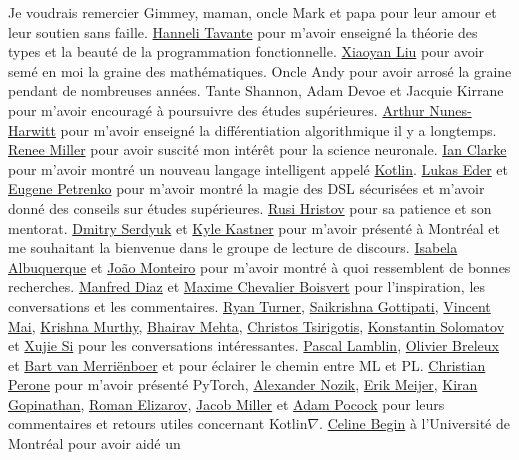 \vspace{-60pt} Je voudrais remercier Gimmey, maman, oncle Mark et papa pour leur amour et leur soutien sans faille. \href{http://hannelita.com/}{Hanneli Tavante} pour m'avoir enseigné la théorie des types et la beauté de la programmation fonctionnelle. \href{https://laverne.edu/directory/person/xiaoyan-liu/}{Xiaoyan Liu} pour avoir semé en moi la graine des mathématiques. Oncle Andy pour avoir arrosé la graine pendant de nombreuses années. Tante Shannon, Adam Devoe et Jacquie Kirrane pour m'avoir encouragé à poursuivre des études supérieures. \href{https://www.cs.rit.edu/~anh/}{Arthur Nunes-Harwitt} pour m'avoir enseigné la différentiation algorithmique il y a longtemps. \href{https://www.sas.rochester.edu/bcs/people/faculty/miller_renee/index.html}{Renee Miller} pour avoir suscité mon intérêt pour la science neuronale. \href{http://blog.locut.us}{Ian Clarke} pour m'avoir montré un nouveau langage intelligent appelé \href{https://kotlinlang.org/}{Kotlin}. \href{https://www.jooq.org/}{Lukas Eder} et \href{https://jonnyzzz.com/}{Eugene Petrenko} pour m'avoir montré la magie des DSL sécurisées et m'avoir donné des conseils sur études supérieures. \href{https://github.com/rusi}{Rusi Hristov} pour sa patience et son mentorat. \href{https://scholar.google.ca/citations?user=PsKlNzUAAAAJ}{Dmitry Serdyuk} et \href{http://kastnerkyle.github.io/}{Kyle Kastner} pour m'avoir présenté à Montréal et me souhaitant la bienvenue dans le groupe de lecture de discours. \href{https://scholar.google.ca/citations?user=-Ss9QGkAAAAJ}{Isabela Albuquerque} et \href{https://scholar.google.ca/citations?user=hkO47vsAAAAJ}{Jo\~ao Monteiro} pour m'avoir montré à quoi ressemblent de bonnes recherches. \href{https://takeitallsource.github.io}{Manfred Diaz} et \href{https://pointersgonewild.com/}{Maxime Chevalier Boisvert} pour l'inspiration, les conversations et les commentaires. \href{http://TurnerComputing.com}{Ryan Turner}, \href{https://saikrishna-1996.github.io}{Saikrishna Gottipati}, \href{https://maivincent.github.io}{Vincent Mai}, \href{https://krrish94.github.io/}{Krishna Murthy}, \href{https://bhairavmehta95.github.io/}{Bhairav ​​Mehta}, \href{https://mila.quebec/fr/person/christos-tsirigotis/}{Christos Tsirigotis}, \href{http://www.solomatov.me/}{Konstantin Solomatov} et \href{https://www.seas.upenn.edu/~ xsi/}{Xujie Si} pour les conversations intéressantes. \href{https://scholar.google.ca/citations?user=bn4xHHIAAAAJ}{Pascal Lamblin}, \href{http://breuleux.net}{Olivier Breleux} et \href{https://scholar.google.ca/citations? user = XE9SDzgAAAAJ}{Bart van Merri\"enboer} et pour éclairer le chemin entre ML et PL. \href{http://christianperone.com}{Christian Perone} pour m'avoir présenté PyTorch, \href{https://research.jetbrains.org/researchers/altavir}{Alexander Nozik}, \href{https://twitter.com/headinthebox}{Erik Meijer}, \href{https://scholar.google.com/citations?user=IcuGXgcAAAAJ}{Kiran Gopinathan}, \href{https://medium.com/@elizarov}{Roman Elizarov}, \href{https://cquic.unm.edu/member/jacob.miller/}{Jacob Miller} et \href{http://www.adampocock.com/}{Adam Pocock} pour leurs commentaires et retours utiles concernant Kotlin$\nabla$. \href{https://diro.umontreal.ca/accueil/}{Celine Begin} à l'Université de Montréal pour avoir aidé un 